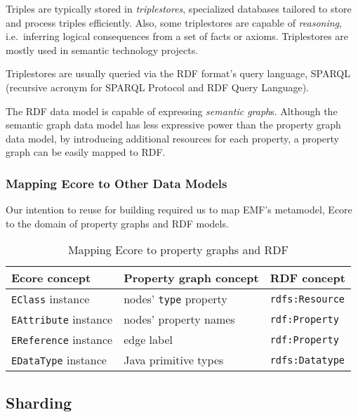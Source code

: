 Triples are typically stored in \emph{triplestores}, specialized databases tailored to store and process triples efficiently. Also, some triplestores are capable of \emph{reasoning}, i.e.\ inferring logical consequences from a set of facts or axioms. Triplestores are mostly used in semantic technology projects.

Triplestores are usually queried via the RDF format's query language, SPARQL (recursive acronym for SPARQL Protocol and RDF Query Language). 

The RDF data model is capable of expressing \emph{semantic graph}s. Although the semantic graph data model has less expressive power than the property graph data model, by introducing additional resources for each property, a property graph can be easily mapped to RDF.

\subsubsection{Mapping Ecore to Other Data Models}
\label{ecore-mapping}

Our intention to reuse \eiq{} for building \iqd{} required us to map EMF's metamodel, Ecore to the domain of property graphs and RDF models.

\begin{table}[htb]

\centering
\begin{tabular}{ | l | l | l | }

\hline
\bf Ecore concept          & \bf Property graph concept  & \bf RDF concept \tabularnewline \hline\hline
\verb+EClass+ instance     & nodes' \verb+type+ property & \verb+rdfs:Resource+ \\ \hline
\verb+EAttribute+ instance & nodes' property names       & \verb+rdf:Property+  \\ \hline
\verb+EReference+ instance & edge label                  & \verb+rdf:Property+  \\ \hline
\verb+EDataType+ instance  & Java primitive types        & \verb+rdfs:Datatype+ \\ \hline
 
\end{tabular}
\caption{Mapping Ecore to property graphs and RDF}
\label{tab:ecore-mapping}

\end{table}




\subsection{Sharding}
 
